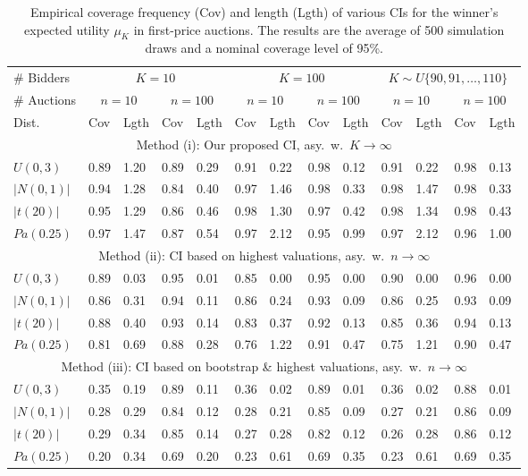 \begin{table}[ht]
\centering
\renewcommand{\arraystretch}{1.5}
\begin{tabular}{lllllllllllll}
\hline\hline
\# Bidders & \multicolumn{4}{c}{$K=10$} & \multicolumn{4}{c}{$K=100$} & \multicolumn{4}{c}{$K\sim U\{90,91,\dots,110\}$} \\ 
\# Auctions & \multicolumn{2}{c}{$n=10$} & \multicolumn{2}{c}{$n=100$} & \multicolumn{2}{c}{$n=10$} & \multicolumn{2}{c}{$n=100$} & \multicolumn{2}{c}{$n=10$} & \multicolumn{2}{c}{$n=100$} \\ \hline
Dist.\ & Cov & Lgth & Cov & Lgth & Cov & Lgth & Cov & Lgth & Cov & Lgth & Cov & Lgth\\ \hline
\multicolumn{13}{c}{Method (i): Our proposed CI, asy.\ w.\ $K\to\infty$} \\ 
$U(0,3)$               & 0.89 & 1.20 & 0.89 & 0.29 & 0.91 & 0.22 & 0.98 & 0.12 & 0.91 & 0.22 & 0.98 & 0.13 \\ 
{$\vert N(0,1) \vert$} & 0.94 & 1.28 & 0.84 & 0.40 & 0.97 & 1.46 & 0.98 & 0.33 & 0.98 & 1.47 & 0.98 & 0.33 \\ 
{$\vert t(20) \vert$}  & 0.95 & 1.29 & 0.86 & 0.46 & 0.98 & 1.30 & 0.97 & 0.42 & 0.98 & 1.34 & 0.98 & 0.43 \\ 
$Pa(0.25) $            & 0.97 & 1.47 & 0.87 & 0.54 & 0.97 & 2.12 & 0.95 & 0.99 & 0.97 & 2.12 & 0.96 & 1.00 \\ 
\hline
\multicolumn{13}{c}{Method (ii): CI based on highest valuations, asy.\ w.\ $n\to\infty$} \\  
$U(0,3)$               & 0.89 & 0.03 & 0.95 & 0.01 & 0.85 & 0.00 & 0.95 & 0.00 & 0.90 & 0.00 & 0.96 & 0.00 \\
{$\vert N(0,1) \vert$} & 0.86 & 0.31 & 0.94 & 0.11 & 0.86 & 0.24 & 0.93 & 0.09 & 0.86 & 0.25 & 0.93	& 0.09\\ 
{$\vert t(20) \vert$}  & 0.88 & 0.40 & 0.93 & 0.14 & 0.83 & 0.37 & 0.92 & 0.13 & 0.85 & 0.36 & 0.94 & 0.13 \\ 
$Pa(0.25) $            & 0.81 & 0.69 & 0.88 & 0.28 & 0.76 & 1.22 & 0.91 & 0.47 & 0.75 & 1.21 & 0.90 & 0.47 \\  
\hline
\multicolumn{13}{c}{Method (iii): CI based on bootstrap \& highest valuations, asy.\ w.\ $n\to\infty$} \\  
$U(0,3)$               & 0.35 & 0.19 & 0.89 & 0.11 & 0.36 & 0.02 & 0.89 & 0.01 & 0.36 & 0.02 & 0.88 & 0.01 \\ 
{$\vert N(0,1) \vert$} & 0.28 & 0.29 & 0.84 & 0.12 & 0.28 & 0.21 & 0.85 & 0.09 & 0.27 & 0.21 & 0.86 & 0.09 \\ 
{$\vert t(20) \vert$}  & 0.29 & 0.34 & 0.85 & 0.14 & 0.27 & 0.28 & 0.82 & 0.12 & 0.26 & 0.28 & 0.86 & 0.12 \\ 
{$Pa(0.25) $}          & 0.20 & 0.34 & 0.69 & 0.20 & 0.23 & 0.61 & 0.69 & 0.35 & 0.23 & 0.61 & 0.69 & 0.35 \\ 
\hline\hline
\end{tabular}
\caption{Empirical coverage frequency (Cov) and length (Lgth) of various CIs for the winner's expected utility $\mu_K$ in first-price auctions. The results are the average of 500 simulation draws and a nominal coverage level of 95\%.}
\label{tbl:fp-CI}
\end{table}

